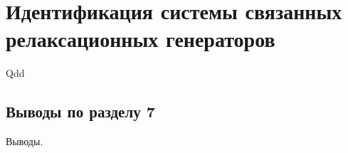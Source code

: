 \chapter{Идентификация системы связанных релаксационных генераторов}

Qdd

\cite{mishenko_du_small_relax}

\section{Выводы по разделу 7}

Выводы.

